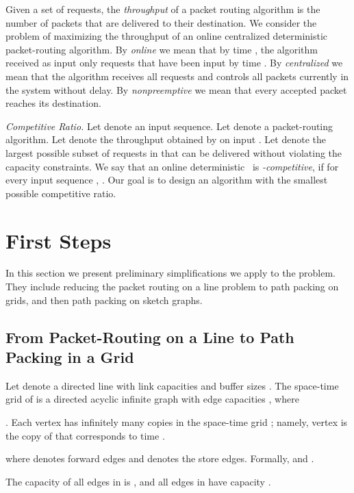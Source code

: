 \documentclass[11pt]{article}
\newcommand{\alg}{\text{\sc{alg}}}
\newenvironment{proof sketch}[1]{\noindent {\emph{Proof sketch of #1:}}}{\hfill \qed}
\begin{document}
Given a set of requests, the \emph{throughput} of a packet routing
algorithm is the number of
packets that are delivered to their destination.  We consider the
problem of maximizing the throughput of an online centralized
deterministic packet-routing algorithm.
By \emph{online} we mean that by time , the algorithm received as
input only requests that have been input by time .
By \emph{centralized} we mean that the algorithm receives
all
requests and controls all  packets currently in the system without delay.
By \emph{nonpreemptive} we mean that every accepted packet reaches its
destination.








\emph{Competitive Ratio.}
Let  denote an input sequence. Let  denote a
packet-routing algorithm.  Let  denote the throughput obtained by  on input . Let  denote the largest possible subset of
requests in  that can be delivered without
violating the capacity constraints. We say that an online
deterministic \alg\ is \emph{-competitive}, if for
every input sequence , . Our goal is to design an
algorithm with the smallest possible competitive ratio.

\section{First Steps}
\label{sec:prelim}
In this section we present preliminary simplifications we apply to the
problem. They include reducing the packet routing on a line problem to path
packing on grids, and then path packing on sketch graphs.

\subsection{From Packet-Routing on a Line to Path Packing in a Grid}
\label{sec:reduction}



Let  denote a directed line with link capacities  and
buffer sizes . The space-time grid of  is a directed
acyclic infinite graph  with edge capacities
, where
\begin{inparaenum}[(i)]
\item . Each vertex 
  has infinitely many copies in the space-time grid ; namely,
  vertex  is the copy of  that corresponds to time
  .
\item  where  denotes forward edges
  and  denotes the store edges.  Formally,  and .
\item The capacity of all edges in  is , and all edges in
   have capacity .
\end{inparaenum}
\end{document}
